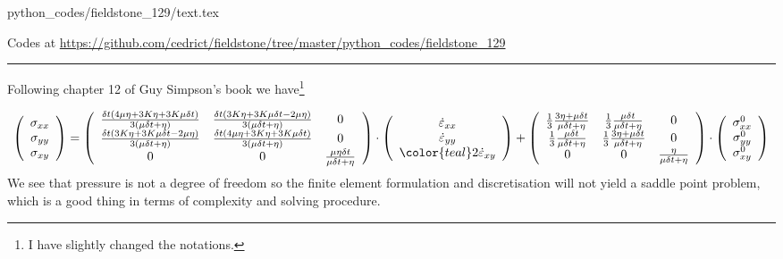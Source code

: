 \begin{flushright} {\tiny {\color{gray} python\_codes/fieldstone\_129/text.tex}} \end{flushright}



\begin{center}
Codes at \url{https://github.com/cedrict/fieldstone/tree/master/python_codes/fieldstone_129}
\end{center}

\par\noindent\rule{\textwidth}{0.4pt}


Following chapter 12 of Guy Simpson's book \cite{simp17} 
we have\footnote{I have slightly changed the notations.}

\[
\left(
\begin{array}{c}
\sigma_{xx}\\ 
\sigma_{yy}\\ 
\sigma_{xy} 
\end{array}
\right)
=
\left(
\begin{array}{ccc}
\frac{\delta t(4\mu \eta + 3K \eta+ 3K \mu\delta t)}{3(\mu \delta t + \eta)} &
\frac{\delta t(3K \eta+ 3K \mu\delta t - 2\mu \eta)}{3(\mu \delta t + \eta)} &
0 \\
\frac{\delta t(3K \eta+ 3K \mu\delta t  - 2\mu \eta)}{3(\mu \delta t + \eta)}&
\frac{\delta t(4\mu \eta + 3K \eta+ 3K \mu\delta t)}{3(\mu \delta t + \eta)} &
0  \\
0 & 0 & \frac{\mu \eta \delta t }{\mu \delta t + \eta}  \\
\end{array}
\right)
\cdot
\left(
\begin{array}{c}
\dot\varepsilon_{xx}\\ 
\dot\varepsilon_{yy}\\ 
{\color{teal}2}\dot\varepsilon_{xy} 
\end{array}
\right) 
+
\left(
\begin{array}{cccccc}
\frac13\frac{3\eta + \mu \delta t}{\mu\delta t+\eta} & 
\frac13\frac{\mu \delta t}{\mu\delta t+\eta} & 
0\\
\frac13\frac{\mu \delta t}{\mu\delta t+\eta} & 
\frac13\frac{3\eta + \mu \delta t}{\mu\delta t+\eta} & 
0\\
0 & 0 & \frac{ \eta}{\mu\delta t + \eta}  
\end{array}
\right)
\cdot
\left(
\begin{array}{c}
\sigma_{xx}^0\\ 
\sigma_{yy}^0\\ 
\sigma_{xy}^0 
\end{array}
\right) 
\]
We see that pressure is not a degree of freedom so the finite element
formulation and discretisation will not yield a saddle point problem, 
which is a good thing in terms of complexity and solving procedure.

